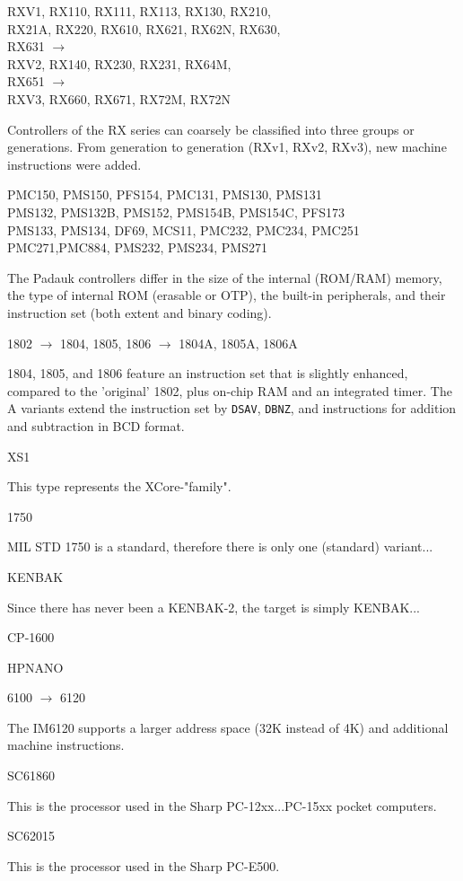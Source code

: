 \documentclass[12pt,twoside]{report}
\newcommand{\tty}[1]{{\tt #1}}
\begin{document}
\begin{cpulist}
   RXV1, RX110, RX111, RX113, RX130, RX210,\\
\> RX21A, RX220, RX610, RX621, RX62N, RX630,\\
\> RX631 $\longrightarrow$ \\
\> RXV2, RX140, RX230, RX231, RX64M,\\
\> RX651 $\longrightarrow$ \\
\> RXV3, RX660, RX671, RX72M, RX72N
\end{cpulist}
Controllers of the RX series can coarsely be classified
into three groups or generations.  From generation to 
generation (RXv1, RXv2, RXv3), new machine instructions
were added.
\begin{cpulist}
   PMC150, PMS150, PFS154, PMC131, PMS130, PMS131 \\
\> PMS132, PMS132B, PMS152, PMS154B, PMS154C, PFS173 \\
\> PMS133, PMS134, DF69, MCS11, PMC232, PMC234, PMC251 \\
\> PMC271,PMC884, PMS232, PMS234, PMS271
\end{cpulist}
The Padauk controllers differ in the size of the internal
(ROM/RAM) memory, the type of internal ROM (erasable or OTP),
the built-in peripherals, and their instruction set (both
extent and binary coding).
\begin{cpulist}
   1802 $\rightarrow$ 1804, 1805, 1806 $\rightarrow$ 1804A,
1805A, 1806A
\end{cpulist}
1804, 1805, and 1806 feature an instruction set that is slightly
enhanced, compared to the 'original' 1802, plus on-chip RAM and
an integrated timer.  The A variants extend the instruction set by
\tty{DSAV}, \tty{DBNZ}, and instructions for addition and
subtraction in BCD format.
\begin{cpulist}
   XS1
\end{cpulist}
This type represents the XCore-"family".
\begin{cpulist}
   1750
\end{cpulist}
MIL STD 1750 is a standard, therefore there is only one
(standard) variant...
\begin{cpulist}
   KENBAK
\end{cpulist}
Since there has never been a KENBAK-2, the target is simply KENBAK...
\begin{cpulist}
   CP-1600
\end{cpulist}
\begin{cpulist}
   HPNANO
\end{cpulist}
\begin{cpulist}
   6100 $\rightarrow$ 6120
\end{cpulist}
The IM6120 supports a larger address space (32K
instead of 4K) and additional machine instructions.
\begin{cpulist}
   SC61860
\end{cpulist}
This is the processor used in the Sharp PC-12xx...PC-15xx pocket computers.
\begin{cpulist}
   SC62015
\end{cpulist}
This is the processor used in the  Sharp PC-E500.
\end{document}
